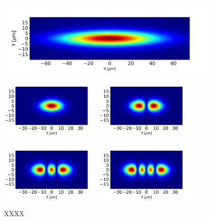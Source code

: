 \documentclass{iucr}              %
\begin{document}
\begin{figure}\label{fig:spectraldensity}
    \centering
        \includegraphics[width=\textwidth]{GRAPHICS/ebs_spectral_density.png}
        \includegraphics[width=0.45\textwidth]{GRAPHICS/ebs_mode0.png}
        \includegraphics[width=0.45\textwidth]{GRAPHICS/ebs_mode1.png}
        \includegraphics[width=0.45\textwidth]{GRAPHICS/ebs_mode2.png}
        \includegraphics[width=0.45\textwidth]{GRAPHICS/ebs_mode3.png}
    \caption{XXXX }
\end{figure}
\end{document}
